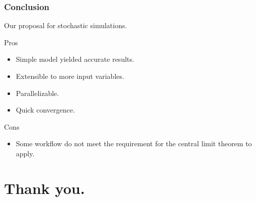 \documentclass{beamer}
\begin{document}
\begin{frame}
	\frametitle{Conclusion}
	\begin{center}
		Our proposal for stochastic simulations.
	\end{center}
	\begin{exampleblock}{Pros}
	\begin{itemize}
		\item Simple model yielded accurate results.
		\item Extensible to more input variables.
		\item Parallelizable.
		\item Quick convergence.
	\end{itemize}
	\end{exampleblock}
	\begin{alertblock}{Cons}
	\begin{itemize}
		\item Some workflow do not meet the requirement for the central
			limit theorem to apply.
	\end{itemize}
	\end{alertblock}
\end{frame}


\section{Thank you.}

\begin{frame}[noframenumbering]
	\maketitle
\end{frame}
\end{document}
